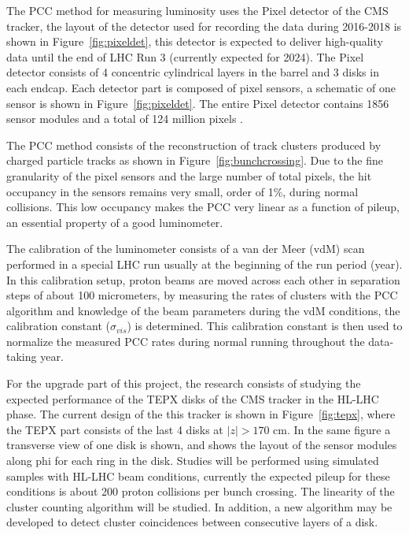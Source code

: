 \documentclass[final,12p]{article}
\begin{document}
The PCC method for measuring luminosity uses the Pixel detector of the CMS tracker, the layout of the  detector used for recording the data during 2016-2018 is shown in Figure~\ref{fig:pixeldet},  this detector is expected to deliver high-quality data until the end of LHC Run 3 (currently expected for 2024).
The Pixel detector consists of 4 concentric cylindrical layers in the barrel and 3 disks in each endcap.
Each detector part is composed of pixel sensors, a schematic of one sensor is shown in Figure~\ref{fig:pixeldet}.
The entire Pixel detector contains 1856 sensor modules and a total of 124 million pixels \cite{TrackerGroupoftheCMS:2020bgg}.

The PCC method consists of the reconstruction of track clusters produced by charged particle tracks as shown in Figure~\ref{fig:bunchcrossing}.
Due to the fine granularity of the pixel sensors and the large number of total pixels, the hit occupancy in the sensors remains very small, order of 1\%, during normal collisions.
This low occupancy makes the PCC  very linear as a function of pileup, an essential property of a good luminometer.

The calibration of the luminometer consists of a van der Meer (vdM) scan performed in a special LHC run usually at the beginning of the run period (year).
In this calibration setup, proton beams are moved across each other in separation steps of about 100 micrometers, by measuring the rates of clusters with the PCC algorithm and knowledge of the beam parameters during the vdM conditions, the calibration constant ($\sigma_{vis}$) is determined.
This calibration constant is then used to normalize the measured PCC rates during normal running throughout the data-taking year.

For the upgrade part of this project, the research consists of studying the expected performance of the TEPX disks of the CMS tracker in the HL-LHC phase.
The current design of the this tracker is shown in Figure~\ref{fig:tepx}, where the TEPX part consists of the last 4 disks at $|z|>170$ cm. In the same figure a transverse view of one disk is shown, and shows the layout of the sensor modules along phi for each ring in the disk.
Studies will be performed using simulated samples with HL-LHC beam conditions, currently the expected pileup for these conditions is about 200 proton collisions per bunch crossing.
The linearity of the cluster counting algorithm will be studied.
In addition, a new algorithm may be developed to detect cluster coincidences between consecutive layers of a disk.
\end{document}

